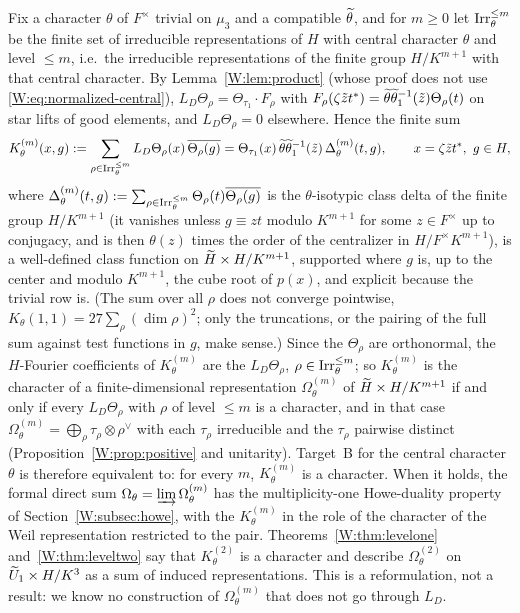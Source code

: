 \begin{remark}\label{W:rem:howe-duality}
Fix a character $\theta$ of $F^\times$ trivial on $\mu_3$ and a
compatible $\widetilde\theta$, and for $m\ge0$ let $\operatorname{Irr}_\theta^{\le m}$ be the
finite set of irreducible representations of $H$ with central character
$\theta$ and level $\le m$, i.e.\ the irreducible representations of
the finite group $H/K^{m+1}$ with that central character.  By
Lemma~\ref{W:lem:product} (whose proof does not use
\eqref{W:eq:normalized-central}), $L_D\Theta_\rho=\Theta_{\tau_1}\cdot F_\rho$
with $F_\rho(\zeta\tilde zt^*)=\widetilde\theta\widetilde\theta_1^{-1}(\tilde z)\Theta_\rho(t)$ on
star lifts of good elements, and $L_D\Theta_\rho=0$ elsewhere.  Hence
the finite sum
\[
 K_\theta^{(m)}(x,g):=\sum_{\rho\in\operatorname{Irr}_\theta^{\le m}}L_D\Theta_\rho(x)\,\overline{\Theta_\rho(g)}
 =\Theta_{\tau_1}(x)\,\widetilde\theta\widetilde\theta_1^{-1}(\tilde z)\,\Delta^{(m)}_\theta(t,g),\qquad x=\zeta\tilde zt^*,\ g\in H,
\]
where $\Delta^{(m)}_\theta(t,g):=\sum_{\rho\in\operatorname{Irr}_\theta^{\le m}}\Theta_\rho(t)\overline{\Theta_\rho(g)}$
is the $\theta$-isotypic class delta of the finite group $H/K^{m+1}$
(it vanishes unless $g\equiv zt$ modulo $K^{m+1}$ for some $z\in F^\times$
up to conjugacy, and is then $\theta(z)$ times the order of the
centralizer in $H/F^\times K^{m+1}$), is a well-defined class function on
$\widetilde H\times H/K^{m+1}$, supported where $g$ is, up to the center and
modulo $K^{m+1}$, the cube root of $p(x)$, and explicit because the
trivial row is.  (The sum over all $\rho$ does not converge pointwise,
$K_\theta(1,1)=27\sum_\rho(\dim\rho)^2$; only the truncations, or the
pairing of the full sum against test functions in $g$, make sense.)
Since the $\Theta_\rho$ are orthonormal, the $H$-Fourier coefficients of
$K^{(m)}_\theta$ are the $L_D\Theta_\rho$, $\rho\in\operatorname{Irr}_\theta^{\le m}$;
so $K_\theta^{(m)}$ is the character of a finite-dimensional
representation $\Omega^{(m)}_\theta$ of $\widetilde H\times H/K^{m+1}$ if and only
if every $L_D\Theta_\rho$ with $\rho$ of level $\le m$ is a character,
and in that case $\Omega^{(m)}_\theta=\bigoplus_{\rho}\tau_\rho\otimes\rho^\vee$
with each $\tau_\rho$ irreducible and the $\tau_\rho$ pairwise distinct
(Proposition~\ref{W:prop:positive} and unitarity).  Target~B for the
central character $\theta$ is therefore equivalent to: for every $m$,
$K^{(m)}_\theta$ is a character.  When it holds, the formal direct sum
$\Omega_\theta=\varinjlim\Omega^{(m)}_\theta$ has the multiplicity-one
Howe-duality property of Section~\ref{W:subsec:howe}, with the
$K^{(m)}_\theta$ in the role of the character of the Weil representation
restricted to the pair.  Theorems~\ref{W:thm:levelone} and~\ref{W:thm:leveltwo}
say that $K^{(2)}_\theta$ is a character and describe
$\Omega^{(2)}_\theta$ on $\widetilde U_1\times H/K^3$ as a sum of induced
representations.  This is a reformulation, not a result: we know no
construction of $\Omega^{(m)}_\theta$ that does not go through $L_D$.
\end{remark}
\endgroup
